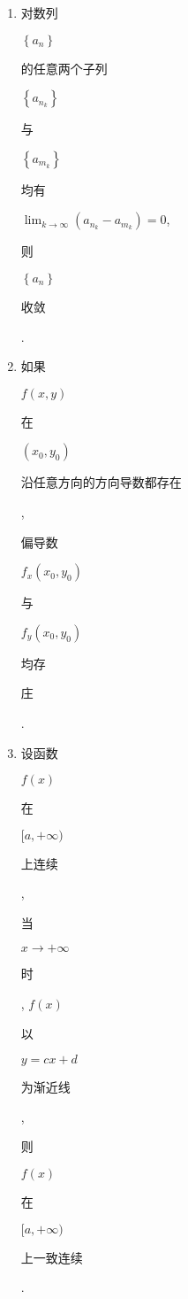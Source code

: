 \documentclass[10pt]{article}
\begin{document}
\begin{enumerate}
  \item \begin{CJK}{UTF8}{mj}对数列\end{CJK} $\left\{a_{n}\right\}$ \begin{CJK}{UTF8}{mj}的任意两个子列\end{CJK} $\left\{a_{n_{k}}\right\}$ \begin{CJK}{UTF8}{mj}与\end{CJK} $\left\{a_{m_{k}}\right\}$ \begin{CJK}{UTF8}{mj}均有\end{CJK} $\lim _{k \rightarrow \infty}\left(a_{n_{k}}-a_{m_{k}}\right)=0$, \begin{CJK}{UTF8}{mj}则\end{CJK} $\left\{a_{n}\right\}$ \begin{CJK}{UTF8}{mj}收敛\end{CJK}.

  \item \begin{CJK}{UTF8}{mj}如果\end{CJK} $f(x, y)$ \begin{CJK}{UTF8}{mj}在\end{CJK} $\left(x_{0}, y_{0}\right)$ \begin{CJK}{UTF8}{mj}沿任意方向的方向导数都存在\end{CJK}, \begin{CJK}{UTF8}{mj}偏导数\end{CJK} $f_{x}\left(x_{0}, y_{0}\right)$ \begin{CJK}{UTF8}{mj}与\end{CJK} $f_{y}\left(x_{0}, y_{0}\right)$ \begin{CJK}{UTF8}{mj}均存\end{CJK} \begin{CJK}{UTF8}{mj}庄\end{CJK}.

  \item \begin{CJK}{UTF8}{mj}设函数\end{CJK} $f(x)$ \begin{CJK}{UTF8}{mj}在\end{CJK} $[a,+\infty)$ \begin{CJK}{UTF8}{mj}上连续\end{CJK}, \begin{CJK}{UTF8}{mj}当\end{CJK} $x \rightarrow+\infty$ \begin{CJK}{UTF8}{mj}时\end{CJK}, $f(x)$ \begin{CJK}{UTF8}{mj}以\end{CJK} $y=c x+d$ \begin{CJK}{UTF8}{mj}为渐近线\end{CJK}, \begin{CJK}{UTF8}{mj}则\end{CJK} $f(x)$ \begin{CJK}{UTF8}{mj}在\end{CJK} $[a,+\infty)$ \begin{CJK}{UTF8}{mj}上一致连续\end{CJK}.


\end{enumerate}
\end{document}
